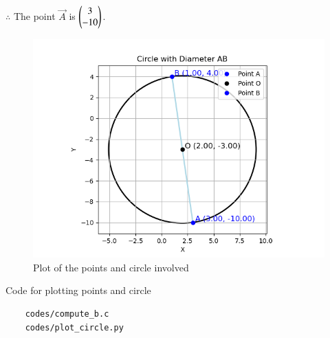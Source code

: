 \documentclass[journal]{IEEEtran}
\begin{document}
$\therefore$ The point $\vec{A}$ is $\begin{pmatrix}3 \\ -10\end{pmatrix}$. \\

\begin{figure}[H]
   \centering
   \includegraphics[width=0.7\columnwidth]{figs/Figure_1.png}
   \caption{Plot of the points and circle involved}
   \label{Fig}
\end{figure}

Code for plotting points and circle
\begin{lstlisting}
	codes/compute_b.c
	codes/plot_circle.py
\end{lstlisting}
\end{document}
